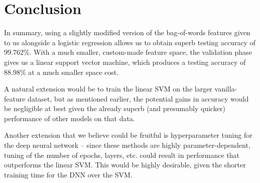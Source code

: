 \documentclass{article} %
\begin{document}
\section{Conclusion}
In summary, using a slightly modified version of the bag-of-words features given to us alongside a logistic regression allows us to obtain superb testing accuracy of 99.762\%.  With a much smaller, custom-made feature space, the validation phase gives us a linear support vector machine, which produces a testing accuracy of 88.98\% at a much smaller space cost.\par 
A natural extension would be to train the linear SVM on the larger vanilla-feature dataset, but as mentioned earlier, the potential gains in accuracy would be negligible at best given the already superb (and presumably quicker) performance of other models on that data.\par 
Another extension that we believe could be fruitful is hyperparameter tuning for the deep neural network -- since these methods are highly parameter-dependent, tuning of the number of epochs, layers, etc. could result in performance that outperforms the linear SVM.  This would be highly desirable, given the shorter training time for the DNN over the SVM.
\end{document}
